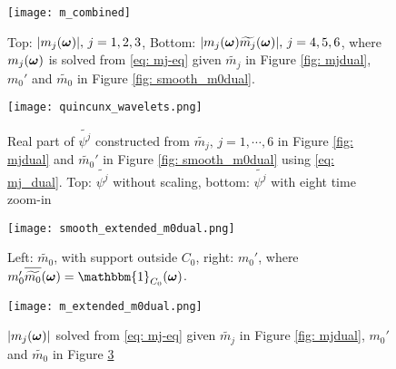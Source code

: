 \begin{figure}
\centering
\texttt{[image: m\_combined]}
\caption{Top: $|m_j(\boldsymbol{\omega})|,\, j= 1,2,3$,
Bottom: $|m_j(\boldsymbol{\omega})\widetilde{m_{j}}(\boldsymbol{\omega})|,\, j=4,5,6$, where $m_j(\boldsymbol{\omega})$ is solved from \eqref{eq: mj-eq} given $\widetilde{m_j}$ in Figure \ref{fig: mjdual}, $m_0'$ and $\widetilde{m_0}$ in Figure \ref{fig: smooth_m0dual}.}
\label{fig: m_j}
\end{figure}

\begin{comment}
\begin{figure}
\centering
\texttt{[image: m.png]}
\caption{ $|m_j(\V{\omega})|$, where $m_j(\V{\omega})$ is solved from \eqref{eq: mj-eq} given $\widetilde{m_j}$ in Figure \ref{fig: mjdual}, $m_0'$ and $\widetilde{m_0}'$ in Figure \ref{fig: smooth_m0dual}. }
\label{fig: m_j}
\end{figure}

\begin{figure}
\centering
\texttt{[image: m\_mdual.png]}
\caption{ $|m_j(\V{\omega})\m{j}|$ for $m_j$ in Figure \ref{fig: m_j} and $\widetilde{m_j}$ in Figure \ref{fig: mjdual}. }
\label{fig: m_j_mjdual}
\end{figure}
\end{comment}

\begin{figure}
\centering
\texttt{[image: quincunx\_wavelets.png]}
\caption{ Real part of $\widetilde{\psi^j}$ constructed from $\widetilde{m_j},\, j=1,\cdots, 6$ in Figure \ref{fig: mjdual} and $\widetilde{m_0}'$ in Figure \ref{fig: smooth_m0dual} using \eqref{eq: mj_dual}. Top: $\widetilde{\psi^j}$ without scaling, bottom: $\widetilde{\psi^j}$ with eight time zoom-in } 
\label{fig: wavelets}
\end{figure}

\begin{figure}[h]
\centering
\texttt{[image: smooth\_extended\_m0dual.png]}
\caption{ Left: $\widetilde{m_0}$, with support outside $C_0$, right: $m_0'$, where $ m_0'\sbarm{0}  = \mathbbm{1}_{C_0}(\V{\omega})$.}
\label{fig: smooth_m0dual-slow}
\end{figure}

\begin{figure}
\texttt{[image: m\_extended\_m0dual.png]}
\caption{$|m_j(\boldsymbol{\omega})|$ solved from \eqref{eq: mj-eq} given $\widetilde{m_j}$ in Figure \ref{fig: mjdual}, $m_0'$ and $\widetilde{m_0}$ in Figure \ref{fig: smooth_m0dual-slow}}
\label{fig: m_j-slow}
\end{figure}



